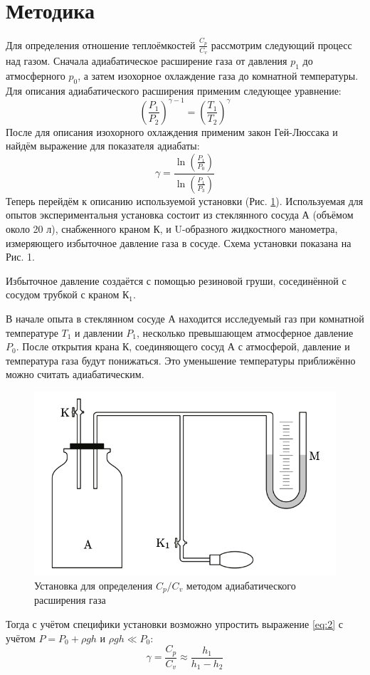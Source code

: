 \documentclass[12pt]{article}
\begin{document}
\section{Методика}
Для определения отношение теплоёмкостей $\frac{C_p}{C_v}$ рассмотрим следующий процесс над газом. Сначала 
адиабатическое расширение газа от давления $p_1$ до атмосферного $p_0$, а затем изохорное 
охлаждение газа до комнатной температуры. Для описания адиабатического расширения применим следующее уравнение: 
\begin{equation}
    \left( \frac{P_1}{P_2} \right)^{\gamma - 1} = \left( \frac{T_1}{T_2} \right)^\gamma  
    \label{eq:1}
\end{equation}
После для описания изохорного охлаждения применим закон Гей-Люссака и найдём выражение для показателя адиабаты: 
\begin{equation}
    \gamma = \frac{\ln \left( \frac{P_1}{P_0} \right) }{\ln \left( \frac{P_1}{P_3} \right) }
    \label{eq:2}
\end{equation}
Теперь перейдём к описанию используемой установки (Рис. \ref{fig:u}). Используемая для опытов экспериментальня установка состоит из стеклянного сосуда А (объёмом около 20 л), снабженного краном К, и U-образного жидкостного манометра, измеряющего избыточное давление газа в сосуде. Схема установки показана на Рис. 1. 

Избыточное давление создаётся с помощью резиновой груши, сосединённой с сосудом трубкой с краном $К_1$.

В начале опыта  в стеклянном сосуде А находится исследуемый газ при комнатной температуре $T_1$ и давлении $P_1$, несколько превышающем атмосферное давление  $P_0$. После открытия крана К, соединяющего сосуд А с атмосферой, давление и температура газа будут понижаться. Это уменьшение температуры приближённо можно считать адиабатическим.
\begin{figure}[H]
    \centering
    \includegraphics[width=0.7\linewidth]{1.jpg}
    \caption{Установка для определения $C_p / C_v$ методом адиабатического расширения газа}
    \label{fig:u}
\end{figure}
Тогда с учётом специфики установки возможно упростить выражение \ref{eq:2} с учётом $P = P_0 + \rho g h$ и $\rho g h \ll P_0$:  
\begin{equation}
    \gamma = \frac{C_p}{C_v} \approx \frac{h_1}{h_1 - h_2}
    \label{eq:gamma}
\end{equation}
\end{document}
